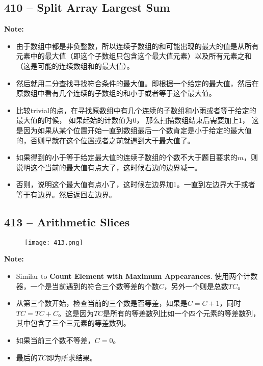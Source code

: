 \documentclass[a4paper,12pt]{article}
\begin{document}
\subsection{410 -- Split Array Largest Sum}
\textbf{\large{Note:}}
\begin{CJK*}{UTF8}{gbsn}
	\begin{itemize}
		\item 由于数组中都是非负整数，所以连续子数组的和可能出现的最大的值是从所有元素中的最大值（即这个子数组只包含这个最大值元素）以及所有元素之和（这是可能的连续数组和的最大值）。
		\item 然后就用二分查找寻找符合条件的最大值。即根据一个给定的最大值，然后在原数组中看有几个连续的子数组的和小于或者等于这个最大值。
		\item 比较trivial的点，在寻找原数组中有几个连续的子数组和小雨或者等于给定的最大值的时候， 如果起始的计数值为0， 那么扫描数组结束后需要加上1， 这是因为如果从某个位置开始一直到数组最后一个数肯定是小于给定的最大值的，否则早就在这个位置或者之前就遇到大于最大值了。
		\item 如果得到的小于等于给定最大值的连续子数组的个数不大于题目要求的$m$，则说明这个当前的最大值有点大了，这时候右边的边界减一。
		\item 否则，说明这个最大值有点小了，这时候左边界加1。一直到左边界大于或者等于有边界。然后返回左边界。
	\end{itemize}
\clearpage
\end{CJK*}

\subsection{413 -- Arithmetic Slices}
	\begin{figure}[H]
	\begin{center}
		\texttt{[image: 413.png]}
	\end{center}
\end{figure}
\textbf{\large{Note:}}
\vspace{1em}
\begin{CJK*}{UTF8}{gbsn}
	\begin{itemize}
		\item Similar to \textbf{Count Element with Maximum Appearances}. 使用两个计数器，一个是当前遇到的符合三个数等差的个数$C$，另外一个则是总数$TC$。
		\item 从第三个数开始，检查当前的三个数是否等差，如果是$C=C+1$，同时$TC=TC+C$。这是因为$TC$是所有的等差数列比如一个四个元素的等差数列，其中包含了三个三元素的等差数列。
		\item 如果当前三个数不等差，$C=0$。
		\item 最后的$TC$即为所求结果。
	\end{itemize}
\end{CJK*}
	
\end{document}
